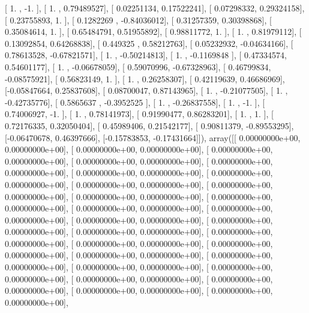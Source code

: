 \documentclass{article}
\begin{document}
       [ 1.        , -1.        ],
       [ 1.        ,  0.79489527],
       [ 0.02251134,  0.17522241],
       [ 0.07298332,  0.29324158],
       [ 0.23755893,  1.        ],
       [ 0.1282269 , -0.84036012],
       [ 0.31257359,  0.30398868],
       [ 0.35084614,  1.        ],
       [ 0.65484791,  0.51955892],
       [ 0.98811772,  1.        ],
       [ 1.        ,  0.81979112],
       [ 0.13092854,  0.64268838],
       [ 0.449325  ,  0.58212763],
       [ 0.05232932, -0.04634166],
       [ 0.78613528, -0.67821571],
       [ 1.        , -0.50214813],
       [ 1.        , -0.1169848 ],
       [ 0.47334574,  0.54601177],
       [ 1.        , -0.06678059],
       [ 0.59070996, -0.67328963],
       [ 0.46799834, -0.08575921],
       [ 0.56823149,  1.        ],
       [ 1.        ,  0.26258307],
       [ 0.42119639,  0.46686969],
       [-0.05847664,  0.25837608],
       [ 0.08700047,  0.87143965],
       [ 1.        , -0.21077505],
       [ 1.        , -0.42735776],
       [ 0.5865637 , -0.3952525 ],
       [ 1.        , -0.26837558],
       [ 1.        , -1.        ],
       [ 0.74006927, -1.        ],
       [ 1.        ,  0.78141973],
       [ 0.91990477,  0.86283201],
       [ 1.        ,  1.        ],
       [ 0.72176335,  0.32050404],
       [ 0.45989406,  0.21542177],
       [ 0.90811379, -0.89553295],
       [-0.06470678,  0.46397666],
       [-0.15783853, -0.17431664]]), array([[  0.00000000e+00,   0.00000000e+00],
       [  0.00000000e+00,   0.00000000e+00],
       [  0.00000000e+00,   0.00000000e+00],
       [  0.00000000e+00,   0.00000000e+00],
       [  0.00000000e+00,   0.00000000e+00],
       [  0.00000000e+00,   0.00000000e+00],
       [  0.00000000e+00,   0.00000000e+00],
       [  0.00000000e+00,   0.00000000e+00],
       [  0.00000000e+00,   0.00000000e+00],
       [  0.00000000e+00,   0.00000000e+00],
       [  0.00000000e+00,   0.00000000e+00],
       [  0.00000000e+00,   0.00000000e+00],
       [  0.00000000e+00,   0.00000000e+00],
       [  0.00000000e+00,   0.00000000e+00],
       [  0.00000000e+00,   0.00000000e+00],
       [  0.00000000e+00,   0.00000000e+00],
       [  0.00000000e+00,   0.00000000e+00],
       [  0.00000000e+00,   0.00000000e+00],
       [  0.00000000e+00,   0.00000000e+00],
       [  0.00000000e+00,   0.00000000e+00],
       [  0.00000000e+00,   0.00000000e+00],
       [  0.00000000e+00,   0.00000000e+00],
       [  0.00000000e+00,   0.00000000e+00],
       [  0.00000000e+00,   0.00000000e+00],
       [  0.00000000e+00,   0.00000000e+00],
       [  0.00000000e+00,   0.00000000e+00],
       [  0.00000000e+00,   0.00000000e+00],
\end{document}
